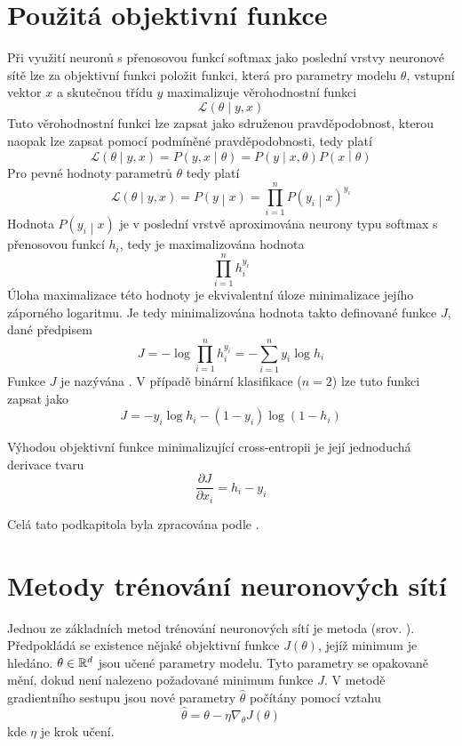 \section{Použitá objektivní funkce}\label{loss_function}
Při využití neuronů s přenosovou funkcí softmax jako poslední vrstvy neuronové sítě lze za objektivní funkci položit funkci, která pro parametry modelu \( \theta \), vstupní vektor \( x \) a skutečnou třídu \( y \) maximalizuje věrohodnostní funkci
\[ \mathcal L \left( \theta \middle| y, x \right) \]
Tuto věrohodnostní funkci lze zapsat jako sdruženou pravděpodobnost, kterou naopak lze zapsat pomocí podmíněné pravděpodobnosti, tedy platí
\[ \mathcal L \left( \theta \middle| y, x \right) = P \left( y, x \middle| \theta \right) = P \left( y \middle| x, \theta \right) P \left( x \middle| \theta \right) \]
Pro pevné hodnoty parametrů \( \theta \) tedy platí
\[ \mathcal L \left( \theta \middle| y, x \right) = P \left( y \middle| x \right) = \prod_{i = 1}^n P \left( y_i \middle| x \right)^{y_i} \]
Hodnota \( P \left( y_i \middle| x \right) \) je v poslední vrstvě aproximována neurony typu softmax s přenosovou funkcí \( h_i \), tedy je maximalizována hodnota
\[ \prod_{i = 1}^n h_i^{y_i} \]
Úloha maximalizace této hodnoty je ekvivalentní úloze minimalizace jejího záporného logaritmu. Je tedy minimalizována hodnota takto definované funkce \( J \), dané předpisem
\[ J = -\log \prod_{i = 1}^n h_i^{y_i} = -\sum_{i = 1}^n y_i \log h_i \]
Funkce \( J \) je nazývána . V případě binární klasifikace (\( n = 2 \)) lze tuto funkci zapsat jako 
\[ J = - y_i \log h_i - \left( 1 - y_i \right) \log \left( 1 - h_i \right) \]

Výhodou objektivní funkce minimalizující cross-entropii je její jednoduchá derivace tvaru
\[ \frac{\partial J}{\partial x_i} = h_i - y_i \]

Celá tato podkapitola byla zpracována podle \cite{roelants_how_2017}.

\section{Metody trénování neuronových sítí}
Jednou ze základních metod trénování neuronových sítí je metoda  (srov. \cite{cauchy_methode_1847}). Předpokládá se existence nějaké objektivní funkce \( J \left( \theta \right) \), jejíž minimum je hledáno. \( \theta \in \mathbb R^d \) jsou učené parametry modelu. Tyto parametry se opakovaně mění, dokud není nalezeno požadované minimum funkce \( J \). V metodě gradientního sestupu jsou nové parametry \( \hat \theta \) počítány pomocí vztahu
\[ \hat \theta = \theta - \eta \nabla_{\theta} J \left( \theta \right) \]
kde \( \eta \) je krok učení.


